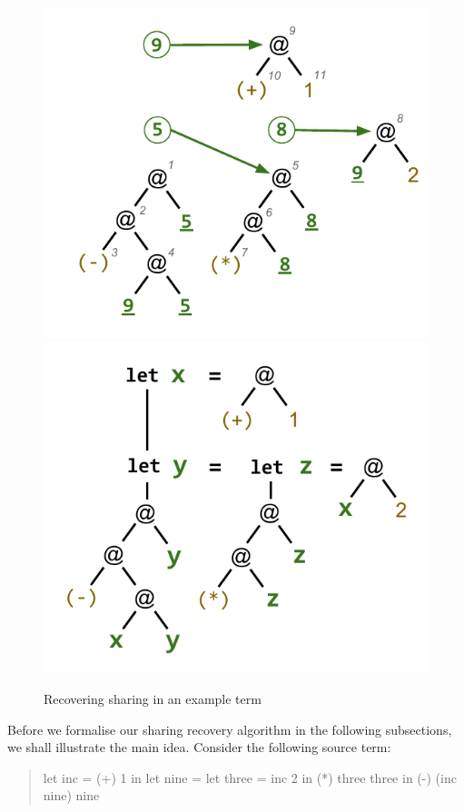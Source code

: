 \begin{figure}
\includegraphics[scale=0.6]{figs/sharing-floated.pdf}
\includegraphics[scale=0.6]{figs/sharing-lets.pdf}
\caption{Recovering sharing in an example term}
\label{fig:sharing}
\end{figure}
%
Before we formalise our sharing recovery algorithm in the following subsections, we shall illustrate the main idea. Consider the following source term:
%
\begin{quote}
\begin{code}
let    inc  = (+) 1
in let nine = let three = inc 2 
              in
              (*) three three
in
(-) (inc nine) nine
\end{code}
\end{quote}
